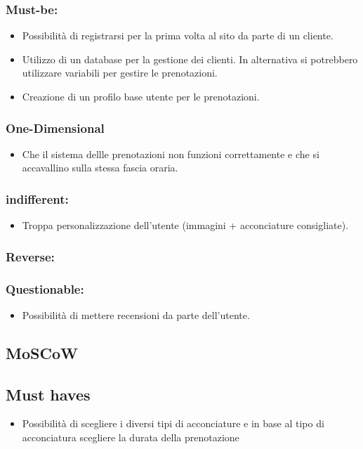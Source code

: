 \documentclass{article}
\begin{document}
\subsubsection{Must-be:}
\begin{itemize}
    \item Possibilità di registrarsi per la prima volta al sito da parte di un cliente.
    \item Utilizzo di un database per la gestione dei clienti. In alternativa si potrebbero utilizzare 
    variabili per gestire le prenotazioni.
    \item Creazione di un profilo base utente per le prenotazioni.
\end{itemize}

\subsubsection{One-Dimensional}
\begin{itemize}
    \item Che il sistema dellle prenotazioni non funzioni correttamente 
    e che si accavallino sulla stessa fascia oraria.
\end{itemize}

\subsubsection{indifferent:}
\begin{itemize}
    \item Troppa personalizzazione dell'utente (immagini + acconciature consigliate).
\end{itemize}
\subsubsection{Reverse:}

\subsubsection{Questionable:}
\begin{itemize}
    \item Possibilità di mettere recensioni da parte dell'utente.
\end{itemize}

\subsection{MoSCoW}

\subsection{Must haves}
\begin{itemize}
    \item Possibilità di scegliere i diversi tipi di acconciature e in 
    base al tipo di acconciatura scegliere la durata della prenotazione 
\end{itemize}
\end{document}
